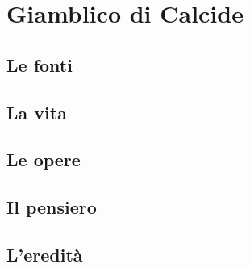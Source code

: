 \chapter{Giamblico di Calcide}

\section{Le fonti}

\section{La vita}

\section{Le opere}

\section{Il pensiero}

\section{L'eredità}
